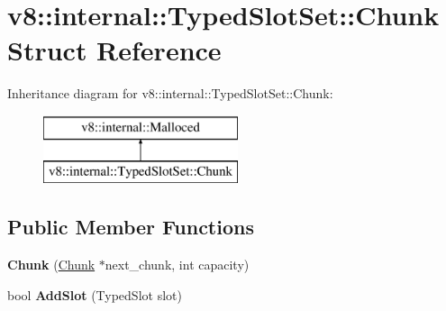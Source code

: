 \hypertarget{structv8_1_1internal_1_1_typed_slot_set_1_1_chunk}{}\section{v8\+:\+:internal\+:\+:Typed\+Slot\+Set\+:\+:Chunk Struct Reference}
\label{structv8_1_1internal_1_1_typed_slot_set_1_1_chunk}
Inheritance diagram for v8\+:\+:internal\+:\+:Typed\+Slot\+Set\+:\+:Chunk\+:\begin{figure}[H]
\begin{center}
\leavevmode
\includegraphics[height=2.000000cm]{structv8_1_1internal_1_1_typed_slot_set_1_1_chunk}
\end{center}
\end{figure}
\subsection*{Public Member Functions}
\begin{DoxyCompactItemize}
\item 
{\bfseries Chunk} (\hyperlink{structv8_1_1internal_1_1_typed_slot_set_1_1_chunk}{Chunk} $\ast$next\+\_\+chunk, int capacity)\hypertarget{structv8_1_1internal_1_1_typed_slot_set_1_1_chunk_aeb1667607873cc32c4984635be11d218}{}\label{structv8_1_1internal_1_1_typed_slot_set_1_1_chunk_aeb1667607873cc32c4984635be11d218}

\item 
bool {\bfseries Add\+Slot} (Typed\+Slot slot)\hypertarget{structv8_1_1internal_1_1_typed_slot_set_1_1_chunk_a34bd59f71ceb297196b6e73ab5424c96}{}\label{structv8_1_1internal_1_1_typed_slot_set_1_1_chunk_a34bd59f71ceb297196b6e73ab5424c96}

\end{DoxyCompactItemize}
